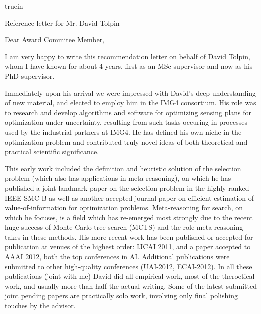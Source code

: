 
\textheight 10in
 truein
\voffset -2.0cm
\hoffset -2.0cm





\signature{Prof. Solomon Eyal  Shimony\\
Vice-Chair\\
Department of Computer Science\\
Ben-Gurion University}



\begin{letter}{  Reference letter for Mr. David Tolpin}

\opening{Dear  Award Commitee Member, }

I am very happy to write this recommendation letter
on behalf of David Tolpin, whom
I have known for about 4 years, first as an MSc supervisor
and now as his PhD supervisor.

Immediately upon his arrival we were impressed with David's
deep understanding of new material, and elected to employ him
in the IMG4 consortium. His role was
to research and develop algorithms and software for optimizing sensing plans
for optimization under uncertainty, resulting from such tasks
occuring in processes used by the industrial partners at IMG4.
He has defined his own niche in the optimization problem and
contributed truly novel ideas of both theoretical and practical scientific
significance. 

This early work included the definition and 
heuristic solution of the selection problem (which also has applications
in meta-reasoning), on which
he has published a joint landmark paper on the selection problem
in the highly ranked IEEE-SMC-B as well as another accepted 
journal paper on efficient 
estimation of value-of-information for optimization problems.
Meta-reasoning for search, on which he focuses,
is a field which has re-emerged most strongly due to the
recent huge success of Monte-Carlo tree search (MCTS) and the role
meta-reasoning takes in these methods. 
His more recent work has been published or accepted for publication
at venues of the highest order: IJCAI 2011, and a paper
accepted to AAAI 2012, both the top conferences
in AI. Additional publications
were submitted to other high-quality conferences (UAI-2012, ECAI-2012).
In all these publications (joint with me) David did all empirical
work, most of the theroetical work, and usually more
than half the actual writing. Some of the latest submitted joint
pending papers are practically solo work, involving only final polishing
touches by the advisor.


\end{letter}

